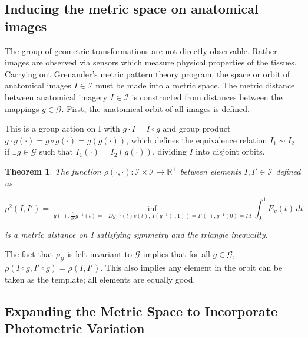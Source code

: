 \documentclass[final, paper=letter,5p,times,twocolumn]{elsarticle}
\newtheorem{theorem}{Theorem} %
\theoremstyle{definition}
\begin{document}

\subsection{Inducing the metric space on anatomical images}

The group of geometric transformations are not directly observable. Rather images are observed via sensors which measure physical properties of the tissues. Carrying out Grenander's metric pattern theory program, the space or orbit of anatomical images $I \in \mathcal{I}$ must be made into a metric space. The metric distance between anatomical imagery $I \in \mathcal{I}$ is constructed from distances between the mappings $g \in \mathcal{G}$. First, the anatomical orbit of all images is defined.


This is a group action on I with $g \cdot I = I \circ g$ and group product $g \cdot g(\cdot) = g \circ g(\cdot) = g(g(\cdot))$, which defines the equivalence relation $I_{1} \sim I_{2}$ if $\exists g \in \mathcal{G}$ such that $I_{1}(\cdot) = I_{2}(g(\cdot))$, dividing $I$ into disjoint orbits.



\begin{theorem}
The function $\rho(\cdot, \cdot): \mathcal{I} \times \mathcal{I} \rightarrow \mathbb{R}^{+}$ between elements $I, I' \in \mathcal{I}$ defined as

\begin{equation}
\rho^{2}(I,I') = \underset{g(\cdot):\frac{\partial}{\partial t}g^{-1}(t) = -Dg^{-1}(t)v(t),\, I(g^{-1}(\cdot,1)) = I'(\cdot), g^{-1}(0) = Id}{\inf} \int_{0}^{1} E_{v}(t) \, dt
\end{equation}

is a metric distance on I satisfying symmetry and the triangle inequality.
\end{theorem}


The fact that $\rho_{\mathcal{G}}$ is left-invariant to $\mathcal{G}$ implies that for all $g \in \mathcal{G}$, $\rho(I \circ g, I' \circ g) = ρ(I, I')$. This also implies any element in the orbit can be taken as the template; all elements are equally good.

\subsection{Expanding the Metric Space to Incorporate Photometric Variation}
\end{document}
